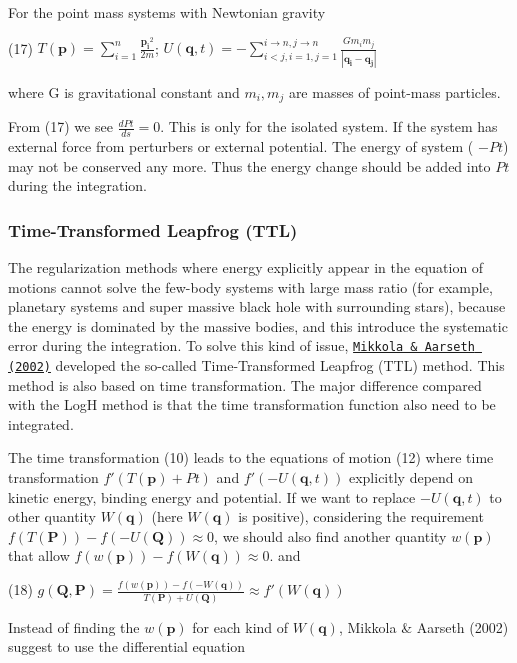 For the point mass systems with Newtonian gravity

(17) $ T(\mathbf{p}) = \sum_{i=1}^{n} \frac{\mathbf{p_i}^2}{2m} $; $ U(\mathbf{q},t) = - \sum_{i<j,i=1,j=1}^{i\rightarrow n,j\rightarrow n} \frac{G m_i m_j}{|\mathbf{q_i}-\mathbf{q_j}|} $

where G is gravitational constant and $ m_i, m_j $ are masses of point-\/mass particles.

From (17) we see $ \frac{d Pt}{d s} = 0 $. This is only for the isolated system. If the system has external force from perturbers or external potential. The energy of system ( $-Pt$) may not be conserved any more. Thus the energy change should be added into $Pt$ during the integration.\hypertarget{index_TTL_sec}{}\subsubsection{Time-\/\+Transformed Leapfrog (\+T\+T\+L)}\label{index_TTL_sec}
The regularization methods where energy explicitly appear in the equation of motions cannot solve the few-\/body systems with large mass ratio (for example, planetary systems and super massive black hole with surrounding stars), because the energy is dominated by the massive bodies, and this introduce the systematic error during the integration. To solve this kind of issue, \href{http://adsabs.harvard.edu/abs/2002CeMDA..84..343M}{\tt Mikkola \& Aarseth (2002)} developed the so-\/called Time-\/\+Transformed Leapfrog (T\+TL) method. This method is also based on time transformation. The major difference compared with the LogH method is that the time transformation function also need to be integrated.

The time transformation (10) leads to the equations of motion (12) where time transformation $ f'(T(\mathbf{p})+Pt) $ and $ f'(-U(\mathbf{q},t))$ explicitly depend on kinetic energy, binding energy and potential. If we want to replace $ -U(\mathbf{q},t) $ to other quantity $ W(\mathbf{q})$ (here $ W(\mathbf{q})$ is positive), considering the requirement $ f(T(\mathbf{P})) - f(-U(\mathbf{Q})) \approx 0 $, we should also find another quantity $ w(\mathbf{p}) $ that allow $ f(w(\mathbf{p})) - f(W(\mathbf{q})) \approx 0 $. and

(18) $ g(\mathbf{Q},\mathbf{P}) = \frac{f(w(\mathbf{p})) - f(-W(\mathbf{q}))}{T(\mathbf{P}) + U(\mathbf{Q})} \approx f'(W(\mathbf{q})) $

Instead of finding the $ w(\mathbf{p}) $ for each kind of $ W(\mathbf{q})$, Mikkola \& Aarseth (2002) suggest to use the differential equation

